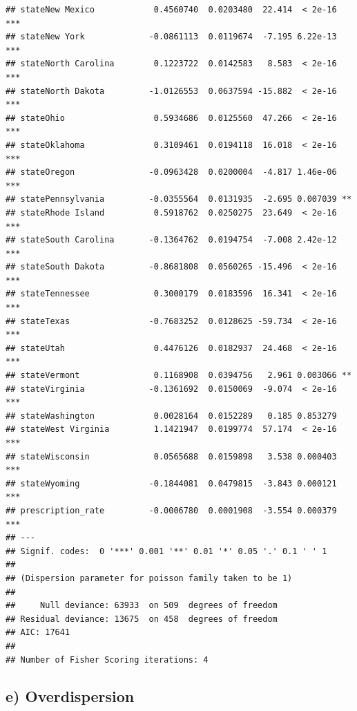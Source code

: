 \documentclass[]{article}
\begin{document}
\begin{verbatim}
## stateNew Mexico            0.4560740  0.0203480  22.414  < 2e-16 ***
## stateNew York             -0.0861113  0.0119674  -7.195 6.22e-13 ***
## stateNorth Carolina        0.1223722  0.0142583   8.583  < 2e-16 ***
## stateNorth Dakota         -1.0126553  0.0637594 -15.882  < 2e-16 ***
## stateOhio                  0.5934686  0.0125560  47.266  < 2e-16 ***
## stateOklahoma              0.3109461  0.0194118  16.018  < 2e-16 ***
## stateOregon               -0.0963428  0.0200004  -4.817 1.46e-06 ***
## statePennsylvania         -0.0355564  0.0131935  -2.695 0.007039 ** 
## stateRhode Island          0.5918762  0.0250275  23.649  < 2e-16 ***
## stateSouth Carolina       -0.1364762  0.0194754  -7.008 2.42e-12 ***
## stateSouth Dakota         -0.8681808  0.0560265 -15.496  < 2e-16 ***
## stateTennessee             0.3000179  0.0183596  16.341  < 2e-16 ***
## stateTexas                -0.7683252  0.0128625 -59.734  < 2e-16 ***
## stateUtah                  0.4476126  0.0182937  24.468  < 2e-16 ***
## stateVermont               0.1168908  0.0394756   2.961 0.003066 ** 
## stateVirginia             -0.1361692  0.0150069  -9.074  < 2e-16 ***
## stateWashington            0.0028164  0.0152289   0.185 0.853279    
## stateWest Virginia         1.1421947  0.0199774  57.174  < 2e-16 ***
## stateWisconsin             0.0565688  0.0159898   3.538 0.000403 ***
## stateWyoming              -0.1844081  0.0479815  -3.843 0.000121 ***
## prescription_rate         -0.0006780  0.0001908  -3.554 0.000379 ***
## ---
## Signif. codes:  0 '***' 0.001 '**' 0.01 '*' 0.05 '.' 0.1 ' ' 1
## 
## (Dispersion parameter for poisson family taken to be 1)
## 
##     Null deviance: 63933  on 509  degrees of freedom
## Residual deviance: 13675  on 458  degrees of freedom
## AIC: 17641
## 
## Number of Fisher Scoring iterations: 4
\end{verbatim}

\hypertarget{e-overdispersion}{%
\subsection{e) Overdispersion}\label{e-overdispersion}}
\end{document}
